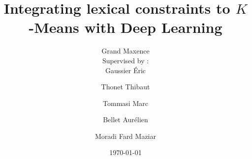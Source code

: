 \title{Integrating lexical constraints  to $K$-Means with Deep Learning}
\author{Grand Maxence\\                                                   
        Supervised by : \\Gaussier \'Eric \and Thonet Thibaut \\ \and Tommasi Marc \and Bellet Aur\'elien  \and Moradi Fard Maziar } 
\date{\today}
